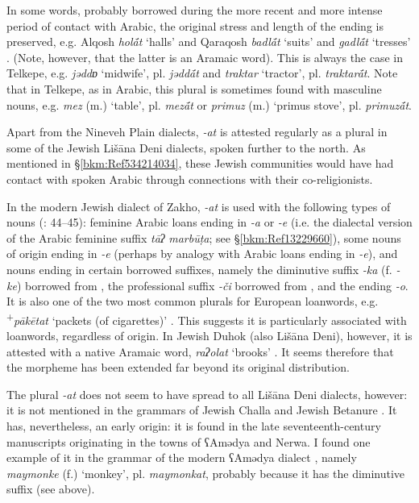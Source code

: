 \documentclass[output=paper]{langsci/langscibook}
\begin{document}
In some words, probably borrowed during the more recent and more intense period of contact with Arabic, the original {stress} and length of the ending is preserved, e.g.  Alqosh \textit{hol\'{ā}t} ‘halls’ and  Qaraqosh \textit{badl\'{ā}t} ‘suits’ and \textit{gadl\'{ā}t} ‘tresses’ \citep[194]{Khan2002}. (Note, however, that the latter is an Aramaic word). This is always the case in Telkepe, e.g. \textit{jəddɒ} ‘midwife’, pl. \textit{jədd\'{ā}t} and \textit{traktar} ‘tractor’, pl. \textit{traktar\'{ā}t}. Note that in Telkepe, as in Arabic, this plural is sometimes found with masculine nouns, e.g. \textit{mez} (m.) ‘table’, pl. \textit{mez\'{ā}t} or \textit{primuz} (m.) ‘primus stove’, pl. \textit{primuz\'{ā}t}.

Apart from the  Nineveh Plain dialects, \textit{\nobreakdash-at} is attested regularly as a plural in some of the Jewish Lišāna Deni dialects, spoken further to the north. As mentioned in §\ref{bkm:Ref534214034}, these Jewish communities would have had contact with spoken Arabic through connections with their co-religionists.

In the modern Jewish dialect of Zakho, \textit{\nobreakdash-at} is used with the following types of nouns (\citealt{Sabar2002}: 44–45): feminine Arabic loans ending in \textit{\nobreakdash-a} or \textit{\nobreakdash-e} (i.e. the dialectal version of the Arabic feminine suffix \textit{tāʔ} \textit{marbūṭa}; see §\ref{bkm:Ref13229660}), some nouns of  origin ending in \textit{\nobreakdash-e} (perhaps by {analogy} with Arabic loans ending in \textit{\nobreakdash-e}), and nouns ending in certain borrowed suffixes, namely the {diminutive} suffix \textit{\nobreakdash-ka} (f. \textit{\nobreakdash-ke}) borrowed from , the professional suffix \textit{{}-či} borrowed from , and the ending \textit{\nobreakdash-o}. It is also one of the two most common plurals for European {loanwords}, e.g. \textsuperscript{+}\textit{pākētat} ‘packets (of cigarettes)’ \citep[57]{Sabar1990}. This suggests it is particularly associated with {loanwords}, regardless of origin. In Jewish Duhok (also Lišāna Deni), however, it is attested with a native Aramaic word, \textit{raʔolat} ‘brooks’ \citep[45]{Sabar2002}. It seems therefore that the morpheme has been extended far beyond its original distribution.

The plural \textit{{}-at} does not seem to have spread to all Lišāna Deni dialects, however: it is not mentioned in the grammars of Jewish Challa \citep{Fassberg2010} and Jewish Betanure \citep{Mutzafi2008}. It has, nevertheless, an early origin: it is found in the late seventeenth-century manuscripts originating in the towns of ʕAmədya and Nerwa. I found one example of it in the grammar of the modern ʕAmədya dialect \citep[70]{Greenblatt2011}, namely \textit{maymonke} (f.) ‘monkey’, pl. \textit{maymonkat}, probably because it has the  {diminutive} suffix (see above).
\end{document}
